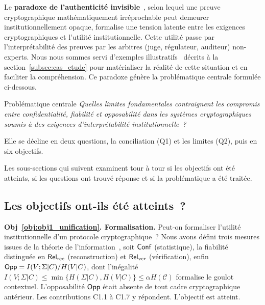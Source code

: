 \begin{sloppypar}

Le \textbf{paradoxe de l'authenticit\'e invisible}~\cite{MINKA2026CLO}, selon lequel une preuve
cryptographique math\'ematiquement irr\'eprochable peut demeurer institutionnellement
opaque, formalise une tension latente entre les exigences cryptographiques et
l'utilit\'e institutionnelle. Cette utilit\'e passe par l'interpr\'etabilit\'e des preuves par
les arbitres (juge, r\'egulateur, auditeur) non-experts. Nous nous sommes servi
d'exemples illustratifs~\cite{IACR2025incident,Adida09UCL} d\'ecrits \`a la
section~\ref{subsec:cas_etude} pour mat\'erialiser la r\'ealit\'e de cette
situation et en faciliter la compr\'ehension. Ce paradoxe g\'en\`ere la
probl\'ematique centrale formul\'ee ci-dessous.

\begin{boiteProblematique}{Probl\'ematique centrale}
\textit{Quelles limites fondamentales contraignent les compromis entre confidentialit\'e,
fiabilit\'e et opposabilit\'e dans les syst\`emes cryptographiques soumis \`a des exigences
d'interpr\'etabilit\'e institutionnelle~?}
\end{boiteProblematique}

Elle se d\'ecline en deux questions, la conciliation (Q1) et les limites (Q2), puis en six objectifs.

Les sous-sections qui suivent examinent tour \`a tour si les objectifs ont \'et\'e
atteints, si les questions ont trouv\'e r\'eponse et si la probl\'ematique a \'et\'e trait\'ee.

\subsection*{Les objectifs ont-ils \'et\'e atteints~?}

\textbf{Obj~\ref{obj:obj1_unification}. Formalisation.} Peut-on formaliser
l'utilit\'e institutionnelle d'un protocole cryptographique~? Nous avons
d\'efini trois mesures issues de la th\'eorie de
l'information~\cite{Shannon48,CoverThomas06}, soit $\mathsf{Conf}$ (statistique), la
fiabilit\'e distingu\'ee en $\mathsf{Rel}_{\mathrm{rec}}$ (reconstruction) et $\mathsf{Rel}_{\mathrm{ver}}$
(v\'erification), enfin $\mathsf{Opp} = I(V;\Sigma|C)/H(V|C)$, dont l'in\'egalit\'e
$I(V;\Sigma|C) \leq \min\{H(\Sigma|C),H(V|C)\} \leq \alpha H(\mathcal{C})$ formalise
le goulot contextuel.
L'opposabilit\'e $\mathsf{Opp}$ \'etait absente de tout cadre cryptographique
ant\'erieur. Les contributions C1.1 \`a C1.7 y r\'epondent. L'objectif est atteint.


\end{sloppypar}
